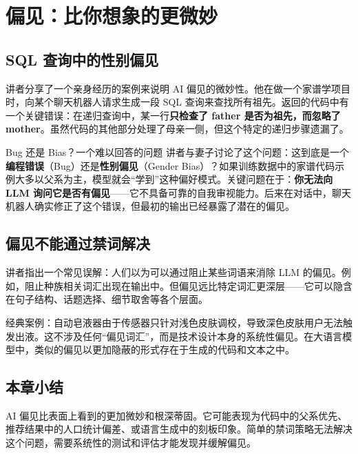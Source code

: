 \section{偏见：比你想象的更微妙}

\subsection{SQL 查询中的性别偏见}

讲者分享了一个亲身经历的案例来说明 AI 偏见的微妙性。他在做一个家谱学项目时，向某个聊天机器人请求生成一段 SQL 查询来查找所有祖先。返回的代码中有一个关键错误：在递归查询中，某一行\textbf{只检查了 father 是否为祖先，而忽略了 mother}。虽然代码的其他部分处理了母亲一侧，但这个特定的递归步骤遗漏了。

\begin{warningbox}{Bug 还是 Bias？一个难以回答的问题}
讲者与妻子讨论了这个问题：这到底是一个\textbf{编程错误}（Bug）还是\textbf{性别偏见}（Gender Bias）？如果训练数据中的家谱代码示例大多以父系为主，模型就会``学到''这种偏好模式。关键问题在于：\textbf{你无法向 LLM 询问它是否有偏见}——它不具备可靠的自我审视能力。后来在对话中，聊天机器人确实修正了这个错误，但最初的输出已经暴露了潜在的偏见。
\end{warningbox}

\subsection{偏见不能通过禁词解决}

讲者指出一个常见误解：人们以为可以通过阻止某些词语来消除 LLM 的偏见。例如，阻止种族相关词汇出现在输出中。但偏见远比特定词汇更深层——它可以隐含在句子结构、话题选择、细节取舍等各个层面。

经典案例：自动皂液器由于传感器只针对浅色皮肤调校，导致深色皮肤用户无法触发出液。这不涉及任何``偏见词汇''，而是技术设计本身的系统性偏见。在大语言模型中，类似的偏见以更加隐蔽的形式存在于生成的代码和文本之中。

\subsection{本章小结}

AI 偏见比表面上看到的更加微妙和根深蒂固。它可能表现为代码中的父系优先、推荐结果中的人口统计偏差、或语言生成中的刻板印象。简单的禁词策略无法解决这个问题，需要系统性的测试和评估才能发现并缓解偏见。

